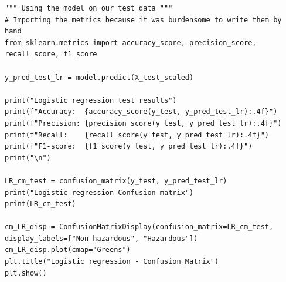 \documentclass{article}
\begin{document}
\begin{lstlisting}
""" Using the model on our test data """
# Importing the metrics because it was burdensome to write them by hand
from sklearn.metrics import accuracy_score, precision_score, recall_score, f1_score

y_pred_test_lr = model.predict(X_test_scaled)

print("Logistic regression test results")
print(f"Accuracy:  {accuracy_score(y_test, y_pred_test_lr):.4f}")
print(f"Precision: {precision_score(y_test, y_pred_test_lr):.4f}")
print(f"Recall:    {recall_score(y_test, y_pred_test_lr):.4f}")
print(f"F1-score:  {f1_score(y_test, y_pred_test_lr):.4f}")
print("\n")

LR_cm_test = confusion_matrix(y_test, y_pred_test_lr)
print("Logistic regression Confusion matrix")
print(LR_cm_test)

cm_LR_disp = ConfusionMatrixDisplay(confusion_matrix=LR_cm_test, display_labels=["Non-hazardous", "Hazardous"])
cm_LR_disp.plot(cmap="Greens")
plt.title("Logistic regression - Confusion Matrix")
plt.show()


\end{lstlisting}
\end{document}
